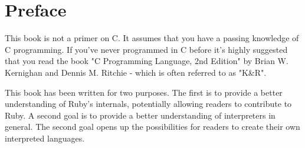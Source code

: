 \chapter*{Preface}

This book is not a primer on C. It assumes that you have a passing knowledge of C programming. If you've never programmed in C before it's highly suggested that you read the book "C Programming Language, 2nd Edition" by Brian W. Kernighan and Dennis M. Ritchie -  which is often referred to as "K\&R".

This book has been written for two purposes. The first is to provide a better understanding of Ruby's internals, potentially allowing readers to contribute to Ruby. A second goal is to provide a better understanding of interpreters in general. The second goal opens up the possibilities for readers to create their own interpreted languages.

